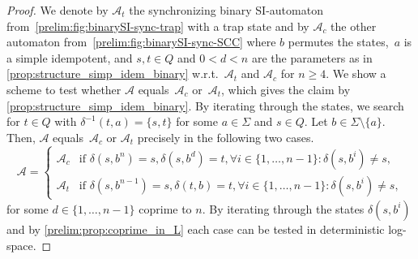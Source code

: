\begin{proof}
	We denote by $\mathcal A_t$ the synchronizing 
	binary SI-automaton from~\cref{prelim:fig:binarySI-sync-trap} with a trap state
	and by $\mathcal A_c$ the other automaton from~\cref{prelim:fig:binarySI-sync-SCC}
	where $b$ permutes the states,~$a$ is a simple idempotent,
	and $s,t \in Q$ and $0 < d < n$
	are the parameters as in \cref{prop:structure_simp_idem_binary} w.r.t.~$\mathcal A_t$ and $\mathcal A_c$
	for $n \ge 4$. 
	We show a scheme to test whether $\mathcal A$
	equals~$\mathcal A_c$ or~$\mathcal A_t$, which gives the claim by \cref{prop:structure_simp_idem_binary}.
	By iterating through the states,
	we search for $t \in Q$
	with $\delta^{-1}(t, a) = \{s,t\}$
	for some $a \in \Sigma$ and $s \in Q$.
	Let $b \in \Sigma\setminus \{a\}$.
	Then, $\mathcal A$ equals~$\mathcal A_c$ or $\mathcal A_t$
	precisely in the following two cases.
	\[
	\mathcal A
	=
	\begin{cases}
		\mathcal A_c & \text{if } \delta(s, b^n) = s, \delta(s, b^d) = t,   \forall i \in \{1,\ldots,n-1\} \colon \delta(s, b^i) \ne s, \\
		\mathcal A_t & \text{if } \delta(s, b^{n-1}) = s, \delta(t, b) = t, \forall i \in \{1,\ldots,n-1\} \colon \delta(s, b^i) \ne s, 
	\end{cases}
	\]
	for some $d \in \{1,\ldots,n-1\}$ coprime to $n$.
	By iterating through the states $\delta(s, b^i)$
	and by \cref{prelim:prop:coprime_in_L} each case can be tested
	in deterministic log-space.

\end{proof}

